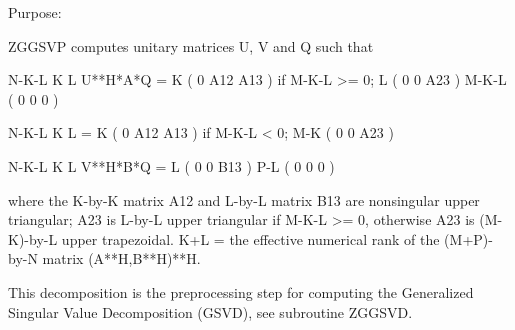  \begin{DoxyParagraph}{Purpose\+: }
\begin{DoxyVerb} ZGGSVP computes unitary matrices U, V and Q such that

                    N-K-L  K    L
  U**H*A*Q =     K ( 0    A12  A13 )  if M-K-L >= 0;
                 L ( 0     0   A23 )
             M-K-L ( 0     0    0  )

                  N-K-L  K    L
         =     K ( 0    A12  A13 )  if M-K-L < 0;
             M-K ( 0     0   A23 )

                  N-K-L  K    L
  V**H*B*Q =   L ( 0     0   B13 )
             P-L ( 0     0    0  )

 where the K-by-K matrix A12 and L-by-L matrix B13 are nonsingular
 upper triangular; A23 is L-by-L upper triangular if M-K-L >= 0,
 otherwise A23 is (M-K)-by-L upper trapezoidal.  K+L = the effective
 numerical rank of the (M+P)-by-N matrix (A**H,B**H)**H. 

 This decomposition is the preprocessing step for computing the
 Generalized Singular Value Decomposition (GSVD), see subroutine
 ZGGSVD.\end{DoxyVerb}
 
\end{DoxyParagraph}

